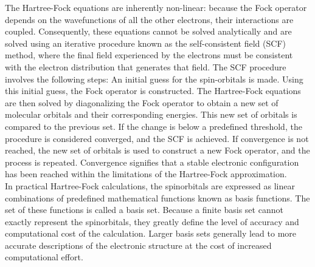 The Hartree-Fock equations are inherently non-linear: because the Fock operator depends on the wavefunctions of all the other electrons, their interactions are coupled. Consequently, these equations cannot be solved analytically and are solved using an iterative procedure known as the self-consistent field (SCF) method, where the final field experienced by the electrons must be consistent with the electron distribution that generates that field. The SCF procedure involves the following steps: An initial guess for the spin-orbitals is made. Using this initial guess, the Fock operator is constructed. The Hartree-Fock equations are then solved by diagonalizing the Fock operator to obtain a new set of molecular orbitals and their corresponding energies. This new set of orbitals is compared to the previous set. If the change is below a predefined threshold, the procedure is considered converged, and the SCF is achieved. If convergence is not reached, the new set of orbitals is used to construct a new Fock operator, and the process is repeated. Convergence signifies that a stable electronic configuration has been reached within the limitations of the Hartree-Fock approximation.\\
In practical Hartree-Fock calculations, the spinorbitals are expressed as linear combinations of predefined mathematical functions known as basis functions. The set of these functions is called a basis set. Because a finite basis set cannot exactly represent the spinorbitals, they greatly define the level of accuracy and computational cost of the calculation. Larger basis sets generally lead to more accurate descriptions of the electronic structure at the cost of increased computational effort.

